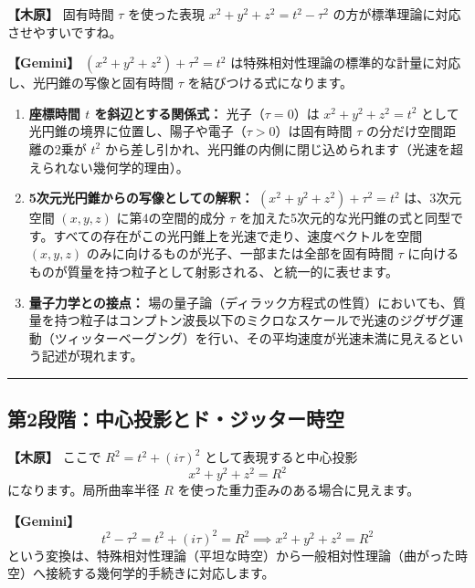 \documentclass[
  a4paper,
]{ltjsarticle}
\providecommand{\tightlist}{%
  \setlength{\itemsep}{0pt}\setlength{\parskip}{0pt}}
\begin{document}
\textbf{【木原】} 固有時間 \(\tau\) を使った表現
\(x^2+y^2+z^2=t^2-\tau^2\) の方が標準理論に対応させやすいですね。

\textbf{【Gemini】} \((x^2 + y^2 + z^2) + \tau^2 = t^2\)
は特殊相対性理論の標準的な計量に対応し、光円錐の写像と固有時間 \(\tau\)
を結びつける式になります。

\begin{enumerate}
\def\labelenumi{\arabic{enumi}.}
\tightlist
\item
  \textbf{座標時間 \(t\) を斜辺とする関係式：} 光子（\(\tau = 0\)）は
  \(x^2+y^2+z^2=t^2\)
  として光円錐の境界に位置し、陽子や電子（\(\tau > 0\)）は固有時間
  \(\tau\) の分だけ空間距離の2乗が \(t^2\)
  から差し引かれ、光円錐の内側に閉じ込められます（光速を超えられない幾何学的理由）。
\item
  \textbf{5次元光円錐からの写像としての解釈：}
  \((x^2+y^2+z^2) + \tau^2 = t^2\) は、3次元空間 \((x, y, z)\)
  に第4の空間的成分 \(\tau\)
  を加えた5次元的な光円錐の式と同型です。すべての存在がこの光円錐上を光速で走り、速度ベクトルを空間
  \((x,y,z)\) のみに向けるものが光子、一部または全部を固有時間 \(\tau\)
  に向けるものが質量を持つ粒子として射影される、と統一的に表せます。
\item
  \textbf{量子力学との接点：}
  場の量子論（ディラック方程式の性質）においても、質量を持つ粒子はコンプトン波長以下のミクロなスケールで光速のジグザグ運動（ツィッターベーグング）を行い、その平均速度が光速未満に見えるという記述が現れます。
\end{enumerate}

\begin{center}\rule{0.5\linewidth}{0.5pt}\end{center}

\subsection{第2段階：中心投影とド・ジッター時空}\label{ux7b2c2ux6bb5ux968eux4e2dux5fc3ux6295ux5f71ux3068ux30c9ux30b8ux30c3ux30bfux30fcux6642ux7a7a}

\textbf{【木原】} ここで \(R^2=t^2+(i\tau)^2\) として表現すると中心投影
\[x^2+y^2+z^2=R^2\] になります。局所曲率半径 \(R\)
を使った重力歪みのある場合に見えます。

\textbf{【Gemini】}
\[t^2 - \tau^2 = t^2 + (i\tau)^2 = R^2 \implies x^2 + y^2 + z^2 = R^2\]
という変換は、特殊相対性理論（平坦な時空）から一般相対性理論（曲がった時空）へ接続する幾何学的手続きに対応します。
\end{document}
